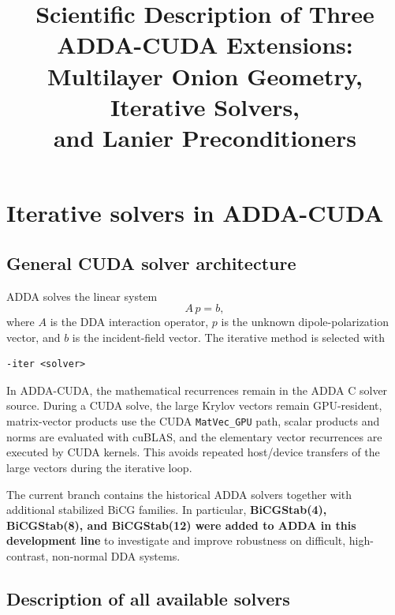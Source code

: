 \documentclass[11pt,a4paper]{article}
\title{\textbf{Scientific Description of Three ADDA-CUDA Extensions:\\Multilayer Onion Geometry, Iterative Solvers,\\and Lanier Preconditioners}}
\author{}
\date{}
\begin{document}
\maketitle




\section{ Iterative solvers in ADDA-CUDA}

\subsection{General CUDA solver architecture}

ADDA solves the linear system
\begin{equation}
A\,p=b,
\end{equation}
where \(A\) is the DDA interaction operator, \(p\) is the unknown dipole-polarization vector, and \(b\) is the incident-field vector. The iterative method is selected with
\begin{verbatim}
-iter <solver>
\end{verbatim}

In ADDA-CUDA, the mathematical recurrences remain in the ADDA C solver source. During a CUDA solve, the large Krylov vectors remain GPU-resident, matrix-vector products use the CUDA \texttt{MatVec\_GPU} path, scalar products and norms are evaluated with cuBLAS, and the elementary vector recurrences are executed by CUDA kernels. This avoids repeated host/device transfers of the large vectors during the iterative loop.

The current branch contains the historical ADDA solvers together with additional stabilized BiCG families. In particular, \textbf{BiCGStab(4), BiCGStab(8), and BiCGStab(12) were added to ADDA in this development line} to investigate and improve robustness on difficult, high-contrast, non-normal DDA systems.

\subsection{Description of all available solvers}
\end{document}
